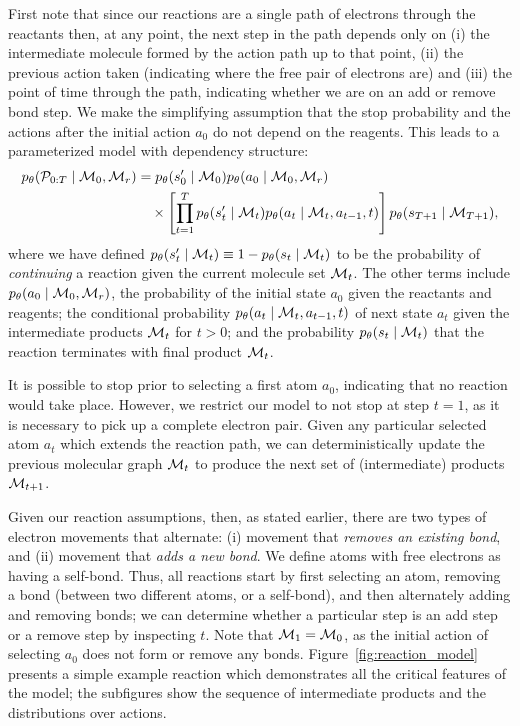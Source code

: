 First note that since our reactions are a single path of electrons through the reactants then, at any point, the next step in the path depends only on (i) the intermediate molecule formed by the action path up to that point, (ii) the previous action taken (indicating where the free pair of electrons are) and (iii) the point of time through the path, indicating whether we are on an add or remove bond step. 
We make the simplifying assumption that the stop probability and the actions after the initial action $a_0$ do not depend on the reagents. This leads to a parameterized model with dependency structure:
\begin{align}
\label{eq:jointprob}
p_\theta({\mathcal{P}}_{0:T} \mid {\mathcal{M}}_0, {\mathcal{M}}_r) 
&=
	p_\theta(s'_0 \mid {\mathcal{M}}_0)
	p_\theta(a_0 \mid {\mathcal{M}}_0, {\mathcal{M}}_r)\\ \nonumber &\quad \times
	\left[\prod_{t=1}^{T}
		p_\theta(s_{t}' \mid {\mathcal{M}}_{t})
		p_\theta(a_t \mid {\mathcal{M}}_{t}, a_{t-1}, t)
	\right]
	p_\theta(s_{T+1} \mid {\mathcal{M}}_{T+1})
	,
\end{align}
where we have defined $p_\theta(s'_t \mid {\mathcal{M}}_t) \equiv 1 - p_\theta(s_t \mid {\mathcal{M}}_t)$ to be the probability of {\em continuing} a reaction given the current molecule set ${\mathcal{M}}_t$.
The other terms include $p_\theta(a_0 \mid {\mathcal{M}}_0, {\mathcal{M}}_r)$, the probability of the initial state $a_0$ given the reactants and reagents; 
the conditional probability $p_\theta(a_t \mid  {\mathcal{M}}_t, a_{t-1}, t)$ 
of next state $a_t$ given the intermediate products ${\mathcal{M}}_t$ for $t > 0$;
and the probability $p_\theta(s_t \mid {\mathcal{M}}_t)$ that the reaction terminates with final product ${\mathcal{M}}_{t}$.



It is possible to stop prior to selecting a first atom $a_0$, indicating that no reaction would take place.
However, we restrict our model to not stop at step $t\!=\!1$, as it is necessary to pick up a complete electron pair. 
Given any particular selected atom $a_t$ which extends the reaction path, we can deterministically update the previous molecular graph ${\mathcal{M}}_{t}$ to produce the next set of (intermediate) products ${\mathcal{M}}_{t+1}$.

Given our reaction assumptions, then, as stated earlier, there are two types of electron movements that alternate: 
(i) movement that \emph{removes an existing bond}, and 
(ii) movement that \emph{adds a new bond}. 
We define atoms with free electrons as having a self-bond.
Thus, all reactions start by first selecting an atom, removing a bond (between two different atoms, or a self-bond), and then alternately adding and removing bonds;
we can determine whether a particular step is an add step or a remove step by inspecting $t$.
Note that ${\mathcal{M}}_1 = {\mathcal{M}}_0$, as the initial action of selecting $a_0$ does not form or remove any bonds.
Figure~\ref{fig:reaction_model} presents a simple example reaction which demonstrates all the critical features of the model;
the subfigures show the sequence of intermediate products and the distributions over actions.



